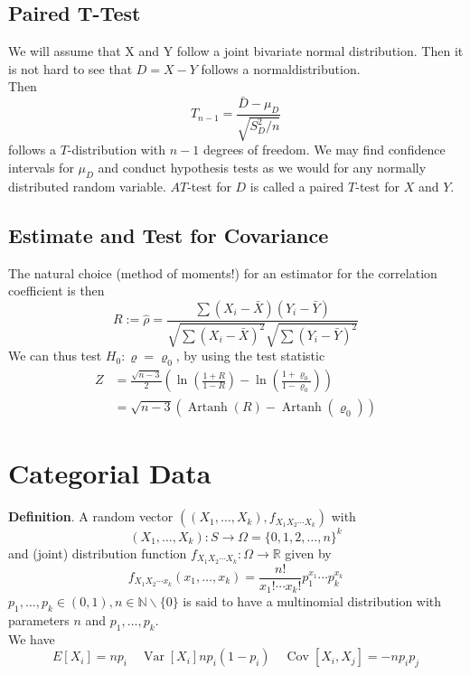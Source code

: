\documentclass[a4paper,12pt]{article}
\begin{document}
\subsection{Paired T-Test}
We will assume that X and Y follow a joint bivariate normal distribution. Then it is not hard to see that $D = X - Y$ follows a normaldistribution.\\
Then
$$
T_{n-1}=\frac{\bar{D}-\mu_D}{\sqrt{S_D^2 / n}}
$$
follows a $T$-distribution with $n-1$ degrees of freedom.
We may find confidence intervals for $\mu_D$ and conduct hypothesis tests as we would for any normally distributed random variable. $A T$-test for $D$ is called a paired $T$-test for $X$ and $Y$.
\subsection{Estimate and Test for Covariance}
The natural choice (method of moments!) for an estimator for the correlation coefficient is then
$$
R:=\hat{\rho}=\frac{\sum\left(X_i-\bar{X}\right)\left(Y_i-\bar{Y}\right)}{\sqrt{\sum\left(X_i-\bar{X}\right)^2} \sqrt{\sum\left(Y_i-\bar{Y}\right)^2}}
$$
We can thus test $H_0: \varrho=\varrho_0$, by using the test statistic
$$
\begin{aligned}
Z & =\frac{\sqrt{n-3}}{2}\left(\ln \left(\frac{1+R}{1-R}\right)-\ln \left(\frac{1+\varrho_0}{1-\varrho_0}\right)\right) \\
& =\sqrt{n-3}\left(\operatorname{Artanh}(R)-\operatorname{Artanh}\left(\varrho_0\right)\right)
\end{aligned}
$$

\section{Categorial Data}
\textbf{Definition}. A random vector $\left(\left(X_1, \ldots, X_k\right), f_{X_1 X_2 \cdots X_k}\right)$ with
$$
\left(X_1, \ldots, X_k\right): S \rightarrow \Omega=\{0,1,2, \ldots, n\}^k
$$
and (joint) distribution function $f_{X_1 X_2 \cdots X_k}: \Omega \rightarrow \mathbb{R}$ given by
\begin{equation}
f_{X_1 X_2 \cdots x_k}\left(x_1, \ldots, x_k\right)=\frac{n !}{x_{1} ! \cdots x_{k} !} p_1^{x_1} \cdots p_k^{x_k}
\end{equation}
$p_1, \ldots, p_k \in(0,1), n \in \mathbb{N} \backslash\{0\}$ is said to have a multinomial distribution with parameters $n$ and $p_1, \ldots, p_k$.\\
We have 
$$
E[X_i]=np_i \quad \operatorname{Var}[X_i]np_i(1-p_i) \quad \operatorname{Cov}[X_i,X_j] = -np_ip_j
$$
\end{document}
